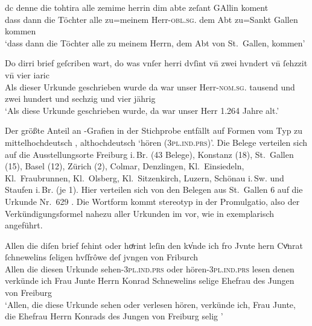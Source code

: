 \begin{exe}
\ex \label{ex:herrin}
	\begin{xlist}
	\ex\label{ex:stg_herrin}
		\setlength{\glossglue}{5pt plus 2pt minus 1pt}
		\gll dc denne die tohtira alle zemime herrin dim abte zeſant GAllin
				koment\\
			dass dann die Töchter alle zu=meinem Herr-\textsc{obl.sg.\MascM}
				dem Abt zu=Sankt Gallen kommen \\
		\trans `dass dann die Töchter alle zu meinem Herrn, dem Abt von
			St.~Gallen, kommen'
			\parencites(Nr.~628, St.~Gallen, 1284)[56,34]{cao2}

	\ex\label{ex:col_herri}
		\gll Do dirri brief geſcriben wart, do was vnſer herri dvſint vn̄ zwei
				hvndert vn̄ ſehzzit vn̄ vier iaric \\
			Als dieser Urkunde geschrieben wurde da war unser
				Herr-\textsc{nom.sg.\MascM} tausend und zwei hundert und
				sechzig und vier jährig \\
		\trans `Als diese Urkunde geschrieben wurde, da war unser Herr
			1.264 Jahre alt.'
			\parencites(Nr.~N~53, Colmar, 1264)[37,15]{cao5}
\end{xlist}
\end{exe}

Der größte Anteil an -Grafien in der Stichprobe entfällt auf Formen vom
Typ  zu mittelhochdeutsch ,
althochdeutsch  `hören (\textsc{3pl.ind.prs})'.
Die Belege verteilen sich auf die Ausstellungsorte Freiburg i.\,Br. (43
Belege), Konstanz (18), St.~Gallen (15), Basel (12), Zürich (2), Colmar,
Denzlingen, Kl.~Einsiedeln, Kl.~Fraubrunnen, Kl.~Olsberg, Kl.~Sitzenkirch,
Luzern, Schönau i.\,Sw. und Staufen i.\,Br. (je 1). Hier verteilen sich von den
Belegen aus St.~Gallen 6 auf die Urkunde Nr.~629 \autocites(St.~Gallen,
1284)[57,9--57,35]{cao2}. Die Wortform  kommt stereotyp in der
Promulgatio, also der Verkündigungsformel nahezu aller Urkunden im \CAO{}
vor, wie in  exemplarisch angeführt.

\begin{exe}
\ex\label{ex:fribr_hoerint}
	\gll Allen die diſen brief ſehint oder hoͤrint leſin den kv̓nde ich fro
			Jvnte hern Cvͦnrat ſchnewelins ſeligen hvſfrôwe deſ jvngen von
			Friburch \\
		Allen die diesen Urkunde sehen-\textsc{3pl.ind.prs} oder
			hören-\textsc{3pl.ind.prs} lesen denen verkünde ich Frau Junte Herrn
			Konrad Schnewelins selige Ehefrau des Jungen von Freiburg \\
	\trans `Allen, die diese Urkunde sehen oder verlesen hören, verkünde
		ich, Frau Junte, die Ehefrau Herrn Konrads des Jungen von Freiburg
		selig \textelp{}'
		\parencites(Nr.~328, Freiburg i.\,Br., 1277)[314,33--34]{cao1}
\end{exe}

